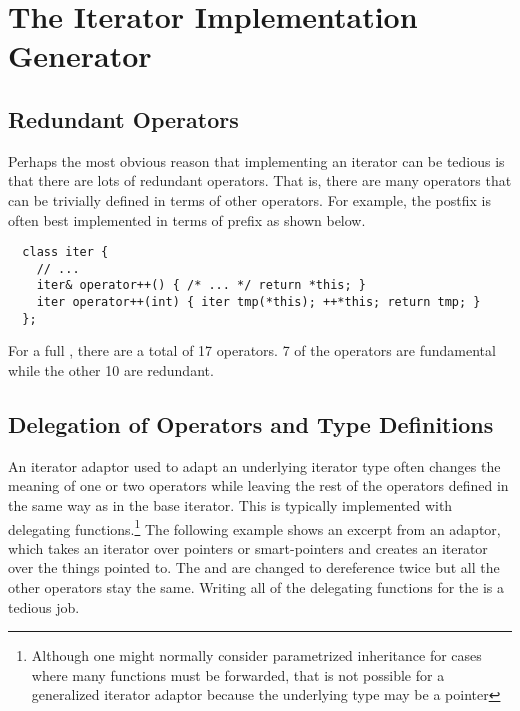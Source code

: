 \documentclass{netobjectdays}
\begin{document}
\section{The Iterator Implementation Generator}

\subsection{Redundant Operators}

Perhaps the most obvious reason that implementing an iterator can
be tedious is that there are lots of redundant operators.  That is,
there are many operators that can be trivially defined in terms of
other operators. For example, the postfix  is often best
implemented in terms of prefix  as shown below.

{\footnotesize
\begin{verbatim}
  class iter {
    // ...
    iter& operator++() { /* ... */ return *this; }
    iter operator++(int) { iter tmp(*this); ++*this; return tmp; }
  };
\end{verbatim}
}

For a full , there are a total of 17
operators. 7 of the operators are fundamental while the other 10 are
redundant.

 


\subsection{Delegation of Operators and Type Definitions}

An iterator adaptor used to adapt an underlying iterator type often
changes the meaning of one or two operators while leaving the rest of
the operators defined in the same way as in the base iterator.  This
is typically implemented with delegating functions.\footnote{Although
one might normally consider parametrized inheritance for cases where
many functions must be forwarded, that is not possible for a
generalized iterator adaptor because the underlying type may be a
pointer} The following example shows an excerpt from an
 adaptor, which takes an iterator over
pointers or smart-pointers and creates an iterator over the things
pointed to. The  and  are changed to
dereference twice but all the other operators stay the same. Writing
all of the delegating functions for the  is a
tedious job.
\end{document}
